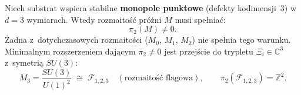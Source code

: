 \begin{theorem}%
\label{thm:D2-monopole-necessary}

Niech substrat wspiera stabilne \textbf{monopole punktowe}
(defekty kodimensji~3) w~$d = 3$ wymiarach.
Wtedy rozmaito\'s\'c pr\'o\.zni $M$ musi spe\l{}nia\'c:
\begin{equation}\label{eq:D2-pi2-required}
  \pi_2(M) \neq 0.
\end{equation}
\.Zadna z~dotychczasowych rozmaito\'sci ($M_0$, $M_1$, $M_2$)
nie spe\l{}nia tego warunku. Minimalnym rozszerzeniem
daj\k{a}cym $\pi_2 \neq 0$ jest przej\'scie do trypletu
$\Xi_i \in \mathbb{C}^3$ z~symetri\k{a} $SU(3)$:
\begin{equation}\label{eq:D2-M3}
  M_3 = \frac{SU(3)}{U(1)^2} \;\cong\; \mathcal{F}_{1,2,3}
  \quad (\text{rozmaito\'s\'c flagowa}),
  \qquad
  \pi_2(\mathcal{F}_{1,2,3}) = \mathbb{Z}^2.
\end{equation}
\end{theorem}

